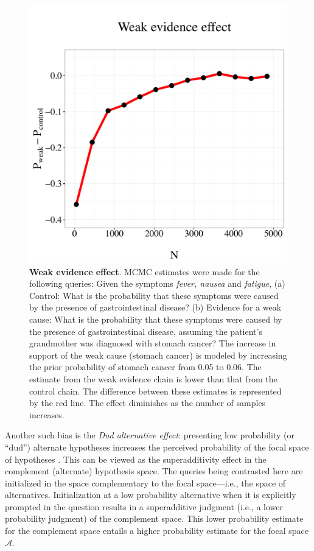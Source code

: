 \begin{figure}
\centering
\includegraphics[scale = 0.5]{figures/weak.pdf}
 \caption{\textbf{Weak evidence effect}. MCMC estimates were made for the following queries: Given the symptoms \emph{fever, nausea}  and \emph{fatigue}, (a) Control: What is the probability that these symptoms were caused by the presence of gastrointestinal disease? (b) Evidence for a weak cause: What is the probability that these symptoms were caused by the presence of gastrointestinal disease, assuming the patient's grandmother was diagnosed with stomach cancer? The increase in support of the weak cause (stomach cancer) is modeled by increasing the prior probability of stomach cancer from 0.05 to 0.06. The estimate from the weak evidence chain is lower than that from the control chain. The difference between these estimates is represented by the red line. The effect diminishes as the number of samples increases.}
 \label{fig:weak}
\end{figure}

Another such bias is the \emph{Dud alternative effect}: presenting low probability (or ``dud'') alternate hypotheses increases the perceived probability of the focal space of hypotheses \citep{dud}. This can be viewed as the superadditivity effect in the complement (alternate) hypothesis space. The queries being contrasted here are initialized in the space complementary to the focal space---i.e., the space of alternatives. Initialization at a low probability alternative when it is explicitly prompted in the question results in a superadditive judgment (i.e., a lower probability judgment) of the complement space. This lower probability estimate for the complement space entails a higher probability estimate for the focal space $\mathcal{A}$.


